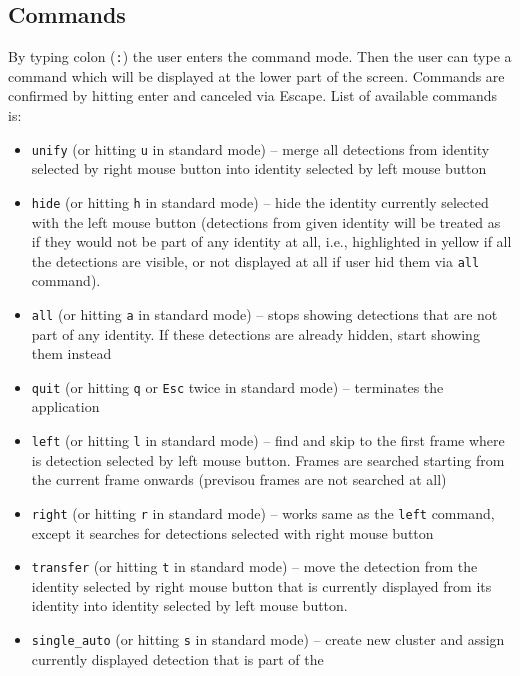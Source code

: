 \subsection{Commands}
\label{sec:commands}

By typing colon (\verb+:+) the user enters the command mode. Then the user can type
a command which will be displayed at the lower part of the screen. Commands are confirmed
by hitting enter and canceled via Escape. List of available commands is:

\begin{itemize}
    \item \verb+unify+ (or hitting \verb+u+ in standard mode) -- merge all detections
    from identity selected by right mouse button into identity selected by left mouse 
    button
    \item \verb+hide+ (or hitting \verb+h+ in standard mode) -- hide the identity
    currently selected with the left mouse button (detections from given identity
    will be treated as if they would not be part of any identity at all, i.e.,
    highlighted in yellow if all the detections are visible, or not displayed at all
    if user hid them via \verb+all+ command).
    \item \verb+all+ (or hitting \verb+a+ in standard mode) -- stops showing detections
    that are not part of any identity. If these detections are already hidden, start
    showing them instead
    \item \verb+quit+ (or hitting \verb+q+ or \verb+Esc+ twice in standard mode) -- terminates
    the application
    \item \verb+left+ (or hitting \verb+l+ in standard mode) -- find and skip to the
    first frame where is detection selected by left mouse button. Frames are searched
    starting from the current frame onwards (previsou frames are not searched at all)
    \item \verb+right+ (or hitting \verb+r+ in standard mode) -- works same as the 
    \verb+left+ command, except it searches for detections selected with right mouse
    button
    \item \verb+transfer+ (or hitting \verb+t+ in standard mode) -- move the detection
    from the identity selected by right mouse button that is currently displayed from
    its identity into identity selected by left mouse button.
    \item \verb+single_auto+ (or hitting \verb+s+ in standard mode) -- create new
    cluster and assign currently displayed detection that is part of the

\end{itemize}
